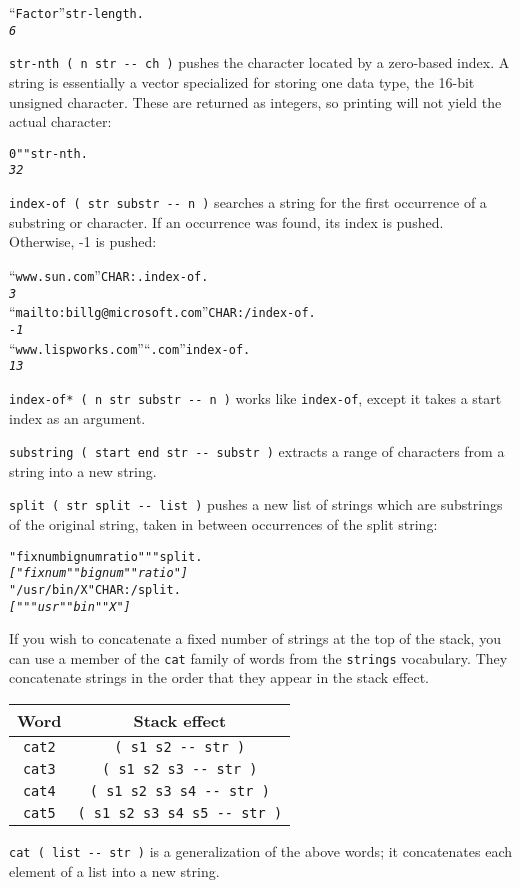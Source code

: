 \documentclass[english]{article}
\providecommand{\tabularnewline}{\\}
\begin{document}
\begin{alltt}
{}``Factor'' str-length .
\emph{6}
\end{alltt}
\texttt{str-nth ( n str -{}- ch )} pushes the character located by
a zero-based index. A string is essentially a vector specialized for
storing one data type, the 16-bit unsigned character. These are returned
as integers, so printing will not yield the actual character:
\begin{alltt}
0 " " str-nth .
\emph{32}
\end{alltt}
\texttt{index-of ( str substr -{}- n )} searches a string for the
first occurrence of a substring or character. If an occurrence was
found, its index is pushed. Otherwise, -1 is pushed:

\begin{alltt}
{}``www.sun.com'' CHAR: . index-of .
\emph{3}
{}``mailto:billg@microsoft.com'' CHAR: / index-of .
\emph{-1}
{}``www.lispworks.com'' {}``.com'' index-of .
\emph{13}
\end{alltt}
\texttt{index-of{*} ( n str substr -{}- n )} works like \texttt{index-of},
except it takes a start index as an argument.

\texttt{substring ( start end str -{}- substr )} extracts a range
of characters from a string into a new string.

\texttt{split ( str split -{}- list )} pushes a new list of strings
which are substrings of the original string, taken in between occurrences
of the split string:

\begin{alltt}
"fixnum bignum ratio" " " split .
\emph{{[} "fixnum" "bignum" "ratio" {]}}
"/usr/bin/X" CHAR: / split .
\emph{{[} "" "usr" "bin" "X" {]}}
\end{alltt}
If you wish to concatenate a fixed number of strings at the top of
the stack, you can use a member of the \texttt{cat} family of words
from the \texttt{strings} vocabulary. They concatenate strings in
the order that they appear in the stack effect.

\begin{tabular}{|c|c|}
\hline 
Word&
Stack effect\tabularnewline
\hline
\hline 
\texttt{cat2}&
\texttt{( s1 s2 -{}- str )}\tabularnewline
\hline 
\texttt{cat3}&
\texttt{( s1 s2 s3 -{}- str )}\tabularnewline
\hline 
\texttt{cat4}&
\texttt{( s1 s2 s3 s4 -{}- str )}\tabularnewline
\hline 
\texttt{cat5}&
\texttt{( s1 s2 s3 s4 s5 -{}- str )}\tabularnewline
\hline
\end{tabular}

\texttt{cat ( list -{}- str )} is a generalization of the above words;
it concatenates each element of a list into a new string.
\end{document}
